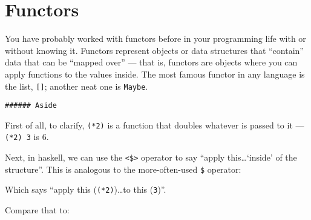 \documentclass[]{article}
\newenvironment{Shaded}{}{}
\newcommand{\DataTypeTok}[1]{\textcolor[rgb]{0.56,0.13,0.00}{{#1}}}
\newcommand{\DecValTok}[1]{\textcolor[rgb]{0.25,0.63,0.44}{{#1}}}
\newcommand{\FunctionTok}[1]{\textcolor[rgb]{0.02,0.16,0.49}{{#1}}}
\newcommand{\NormalTok}[1]{{#1}}
\begin{document}
\section{Functors}\label{functors}

You have probably worked with functors before in your programming life
with or without knowing it. Functors represent objects or data
structures that ``contain'' data that can be ``mapped over'' --- that
is, functors are objects where you can apply functions to the values
inside. The most famous functor in any language is the list,
\texttt{{[}{]}}; another neat one is \texttt{Maybe}.

\begin{Shaded}
\end{Shaded}

\begin{verbatim}
###### Aside
\end{verbatim}

First of all, to clarify, \texttt{(*2)} is a function that doubles
whatever is passed to it --- \texttt{(*2)\ 3} is 6.

Next, in haskell, we can use the \texttt{\textless{}\$\textgreater{}}
operator to say ``apply this\ldots{}`inside' of the structure''. This is
analogous to the more-often-used \texttt{\$} operator:

\begin{Shaded}
\end{Shaded}

Which says ``apply this (\texttt{(*2)})\ldots{}to this (\texttt{3})''.

Compare that to:

\begin{Shaded}
\end{Shaded}
\end{document}
